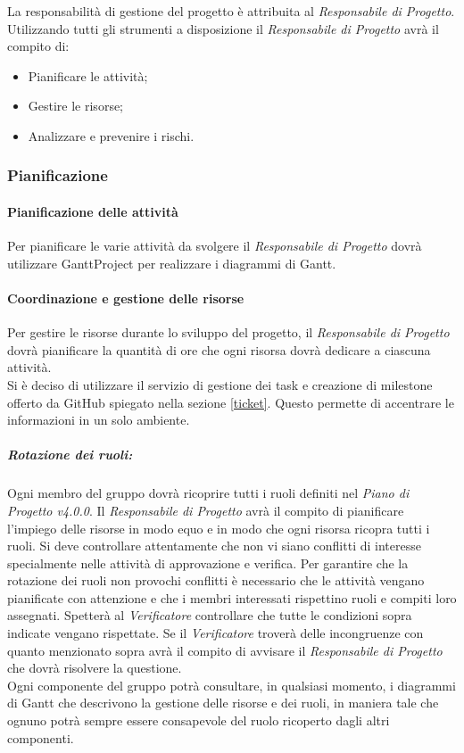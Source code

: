La responsabilità di gestione del progetto è attribuita al \textit{Responsabile di Progetto}. \\
Utilizzando tutti gli strumenti a disposizione il \textit{Responsabile di Progetto} avrà il compito di:
\begin{itemize}
	\item Pianificare le attività;
	\item Gestire le risorse;
	\item Analizzare e prevenire i rischi.
\end{itemize}

\subsubsection{Pianificazione}

\paragraph{Pianificazione delle attività}
Per pianificare le varie attività da svolgere il \textit{Responsabile di Progetto} dovrà utilizzare \gls{GanttProject} per realizzare i diagrammi di \gls{Gantt}.

\paragraph{Coordinazione e gestione delle risorse}
Per gestire le risorse durante lo sviluppo del progetto, il \textit{Responsabile di Progetto} dovrà pianificare la quantità di ore che ogni risorsa dovrà dedicare a ciascuna attività.\\
Si è deciso di utilizzare il servizio di gestione dei \gls{task} e creazione di \gls{milestone} offerto da \gls{GitHub} spiegato nella sezione \ref{ticket}. Questo permette di accentrare le informazioni in un solo ambiente.
	\subparagraph{Rotazione dei ruoli:}
	Ogni membro del gruppo dovrà ricoprire tutti i ruoli definiti nel \textit{Piano di Progetto v4.0.0}. Il \textit{Responsabile di Progetto} avrà il compito di pianificare l'impiego delle risorse in modo equo e in modo che ogni risorsa ricopra tutti i ruoli. 
	Si deve controllare attentamente che non vi siano conflitti di interesse specialmente nelle attività di approvazione e verifica. Per garantire che la rotazione dei ruoli non provochi conflitti è necessario che le attività vengano pianificate con attenzione e che i membri interessati rispettino ruoli e compiti loro assegnati. Spetterà al \textit{Verificatore} controllare che tutte le condizioni sopra indicate vengano rispettate. Se il \textit{Verificatore} troverà delle incongruenze con quanto menzionato sopra avrà il compito di avvisare il \textit{Responsabile di Progetto} che dovrà risolvere la questione.\\
	Ogni componente del gruppo potrà consultare, in qualsiasi momento, i diagrammi di \gls{Gantt} che descrivono la gestione delle risorse e dei ruoli, in maniera tale che ognuno potrà sempre essere consapevole del ruolo ricoperto dagli altri componenti.

